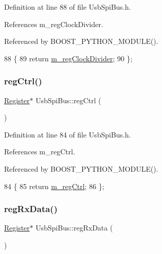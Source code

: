 Definition at line 88 of file Usb\+Spi\+Bus.\+h.



References m\+\_\+reg\+Clock\+Divider.



Referenced by B\+O\+O\+S\+T\+\_\+\+P\+Y\+T\+H\+O\+N\+\_\+\+M\+O\+D\+U\+L\+E().


\begin{DoxyCode}
88                               \{
89     \textcolor{keywordflow}{return} \hyperlink{classUsbSpiBus_abfd5f040a0a8c19d972b26ea581bf1f0}{m\_regClockDivider};
90   \};
\end{DoxyCode}
\mbox{\label{classUsbSpiBus_a22900de7a32af6916f74584f2172424a}} 
\subsubsection{\texorpdfstring{reg\+Ctrl()}{regCtrl()}}
{\footnotesize\ttfamily \hyperlink{classRegister}{Register}$\ast$ Usb\+Spi\+Bus\+::reg\+Ctrl (\begin{DoxyParamCaption}{ }\end{DoxyParamCaption})\hspace{0.3cm}{\ttfamily [inline]}}



Definition at line 84 of file Usb\+Spi\+Bus.\+h.



References m\+\_\+reg\+Ctrl.



Referenced by B\+O\+O\+S\+T\+\_\+\+P\+Y\+T\+H\+O\+N\+\_\+\+M\+O\+D\+U\+L\+E().


\begin{DoxyCode}
84                       \{
85     \textcolor{keywordflow}{return} \hyperlink{classUsbSpiBus_abcd2ac59f2bb4ea5b97ff98f2b7659da}{m\_regCtrl};
86   \};
\end{DoxyCode}
\mbox{\label{classUsbSpiBus_adb0c94f37c7e6008ed4540efa94559b3}} 
\subsubsection{\texorpdfstring{reg\+Rx\+Data()}{regRxData()}}
{\footnotesize\ttfamily \hyperlink{classRegister}{Register}$\ast$ Usb\+Spi\+Bus\+::reg\+Rx\+Data (\begin{DoxyParamCaption}{ }\end{DoxyParamCaption})\hspace{0.3cm}{\ttfamily [inline]}}



